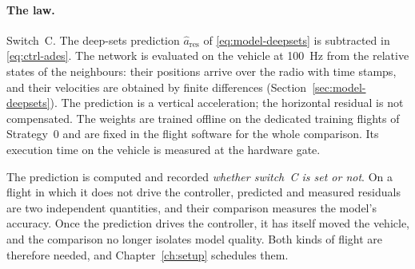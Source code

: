 \paragraph{The law.} Switch~C. The deep-sets prediction $\hat{a}_{\mathrm{res}}$ of
\eqref{eq:model-deepsets} is subtracted in \eqref{eq:ctrl-ades}. The network is evaluated on the
vehicle at \SI{100}{\hertz} from the relative states of the neighbours: their positions arrive over
the radio with time stamps, and their velocities are obtained by finite differences
(Section~\ref{sec:model-deepsets}). The prediction is a vertical acceleration; the horizontal
residual is not compensated. The weights are trained offline on the dedicated training flights of
Strategy~0 and are fixed in the flight software for the whole comparison.
Its execution time on the vehicle is measured at the hardware gate.

The prediction is computed and recorded \emph{whether switch~C is set or not}. On a flight in
which it does not drive the controller, predicted and measured residuals are two independent
quantities, and their comparison measures the model's accuracy. Once the prediction drives the
controller, it has itself moved the vehicle, and the comparison no longer isolates model quality.
Both kinds of flight are therefore needed, and Chapter~\ref{ch:setup} schedules them.

